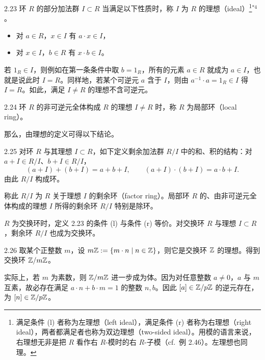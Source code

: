 \begin{definition}{2.23} 环 $R$ 的部分加法群 $I\subset R$ 当满足以下性质时，称 $I$ 为 $R$ 的理想（ideal）\footnote{满足条件 (l) 者称为左理想（left ideal），满足条件 (r) 者称为右理想（right ideal），两者都满足者也称为双边理想（two-sided ideal）。用模的语言来说，右理想无非是把 $R$ 看作右 $R$-模时的右 $R$-子模（cf.\ 例 2.46）。左理想也同理。}$^{*4}$。
\begin{itemize}
  \item[(l)] 对 $a\in R$，$x\in I$ 有 $a\cdot x\in I$，
  \item[(r)] 对 $x\in I$，$b\in R$ 有 $x\cdot b\in I$。
\end{itemize}
\end{definition}

若 $1_R\in I$，则例如在第一条条件中取 $b=1_R$，所有的元素 $a\in R$ 就成为 $a\in I$，也就是说此时 $I=R$。同样地，若某个可逆元 $a$ 含于 $I$，则由 $a^{-1}\cdot a=1_R\in I$ 得
$I=R$。如此，满足 $I\neq R$ 的理想不含可逆元。

\begin{definition}{2.24} 环 $R$ 的非可逆元全体构成 $R$ 的理想 $I\neq R$ 时，称 $R$ 为局部环（local ring）。\end{definition}

那么，由理想的定义可得以下结论。

\begin{proposition}{2.25} 对环 $R$ 与其理想 $I\subset R$，如下定义剩余加法群 $R/I$ 中的和、积的结构：对 $a+I\in R/I$、$b+I\in R/I$，
\[
  (a+I)+(b+I)=a+b+I,\qquad (a+I)\cdot(b+I)=a\cdot b+I .
\]
由此 $R/I$ 构成环。\end{proposition}


称此 $R/I$ 为 $R$ 关于理想 $I$ 的剩余环（factor ring）。局部环 $R$ 的、由非可逆元全体构成的理想 $I$ 所得的剩余环 $R/I$ 特别是除环。

$R$ 为交换环时，定义 2.23 的条件 (l) 与条件 (r) 等价。对交换环 $R$ 与理想 $I\subset R$，剩余环 $R/I$ 也成为交换环。

\begin{example}{2.26} 取某个正整数 $m$，设 $m\mathbb{Z}:=\{m\cdot n \mid n\in\mathbb{Z}\}$，则它是交换环 $\mathbb{Z}$ 的理想。得到交换环 $\mathbb{Z}/m\mathbb{Z}$。

实际上，若 $m$ 为素数，则 $\mathbb{Z}/m\mathbb{Z}$ 进一步成为体。因为对任意整数 $a\neq0$，$a$ 与 $m$ 互素，故必存在满足 $a\cdot n+b\cdot m=1$ 的整数 $n,b$。因此 $[a]\in\mathbb{Z}/p\mathbb{Z}$ 的逆元存在，为 $[n]\in\mathbb{Z}/p\mathbb{Z}$。\end{example}

